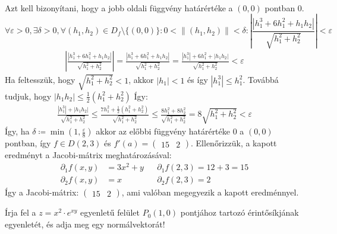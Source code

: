 \documentclass[a4paper,12pt]{article}
\begin{document}
\begin{solution}
\begin{align*}
	\end{align*}
	Azt kell bizonyítani, hogy a jobb oldali függvény határértéke a $ (0,0) $ pontban 0.
	\[
	\forall \varepsilon > 0, \exists \delta > 0, \forall (h_1,h_2) \in D_f \setminus \{(0,0)\}: 0 < \lVert (h_1,h_2) \rVert < \delta: \left | \frac{ \left| h_1^3 + 6h_1^2 + h_1h_2 \right| }{\sqrt{h_1^2 + h_2^2}} \right| < \varepsilon
	\]
	\begin{align*}
		\left| \frac{ \left| h_1^3 + 6h_1^2 + h_1h_2 \right| }{\sqrt{h_1^2 + h_2^2}} \right| = \frac{ \left| h_1^3 + 6h_1^2 + h_1h_2 \right| }{\sqrt{h_1^2 + h_2^2}} = \frac{ \left| h_1^3 \right| + 6h_1^2 + \left| h_1h_2 \right| }{\sqrt{h_1^2 + h_2^2}} < \varepsilon
	\end{align*}
	Ha feltesszük, hogy $\sqrt{h_1^2 + h_2^2} < 1$, akkor $|h_1| < 1$ és így $ \left| h_1^3 \right| \le h_1^2 $. Továbbá tudjuk, hogy $ |h_1h_2| \le \frac{1}{2}(h_1^2 + h_2^2) $ Így:
	\begin{align*}
		\frac{ \left| h_1^3 \right| + \left| h_1h_2 \right| }{\sqrt{h_1^2 + h_2^2}} \le \frac{7h_1^2 + \frac{1}{2}(h_1^2 + h_2^2) }{\sqrt{h_1^2 + h_2^2}} \le \frac{8h_1^2+8h_2^2 }{\sqrt{h_1^2 + h_2^2}} = 8\sqrt{h_1^2 + h_2^2} < \varepsilon
	\end{align*}
	Így, ha $ \delta \coloneq \min{\left( 1,\frac{\varepsilon}{8} \right)} $ akkor az előbbi függvény határértéke $0$ a $(0,0)$ pontban, így $f \in D{(2,3)} $ és $f'(a) = \begin{pmatrix} 15 & 2 \end{pmatrix} $.
	\newpage \noindent
	Ellenőrizzük, a kapott eredményt a Jacobi-mátrix meghatározásával:
	\begin{align*}
		\partial_1 f(x,y) &= 3x^2 + y &&\partial_1 f(2,3) = 12 + 3 = 15 \\
		\partial_2 f(x,y) &= x &&\partial_2 f(2,3) = 2
	\end{align*}
	Így a Jacobi-mátrix: $ \begin{pmatrix} 15 & 2 \end{pmatrix} $, ami valóban megegyezik a kapott eredménnyel.
\end{solution}
\vspace{40px}
\begin{question}
	Írja fel a $ z = x^{2} \cdot e^{xy} $ egyenletű felület $P_0(1,0)$ pontjához tartozó érintősíkjának egyenletét, és adja meg egy normálvektorát!
\end{question}
\end{document}
